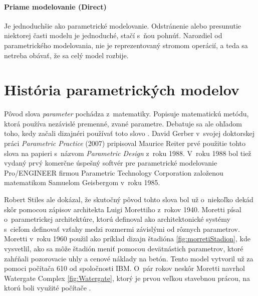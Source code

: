 \paragraph{Priame modelovanie (Direct)}
Je jednoduchšie ako parametrické modelovanie. Odstránenie alebo presunutie niektorej časti modelu je jednoduché, stačí s~ňou pohnúť. Narozdiel od parametrického modelovania, nie je reprezentovaný stromom operácií, a teda sa netreba obávať, že sa celý model rozbije. 


\section{História parametrických modelov}



Pôvod slova \textit{parameter} pochádza z~matematiky. Popisuje matematickú metódu, ktorá používa nezávislé premenné, zvané parametre. Debatuje sa ale ohľadom toho, kedy začali dizajnéri používať toto slovo \cite{davis_2013}. David Gerber v~svojej doktorskej práci \textit{Parametric Practice} (2007) pripisoval Maurice Reiter prvé použitie tohto slova na papieri s~názvom \textit{Parametric Design} z~roku 1988. V~roku 1988 bol tiež vydaný prvý komerčne úspešný softvér pre parametrické modelovanie \textsf{Pro/ENGINEER} firmou Parametric Technology Corporation založenou matematikom Samuelom Geisbergom v~roku 1985.

Robert Stiles ale dokázal, že skutočný pôvod tohto slova bol už o~niekoľko dekád skôr pomocou zápisov architekta Luigi Morettiho z~rokov 1940.  Moretti písal o~parametrickej architektúre, ktorú definoval ako architektonické systémy s~cieľom 
definovať vzťahy medzi rozmermi závislými od rôznych parametrov.
Moretti v~roku 1960 použil ako príklad dizajn štadióna \ref{fig:morretiStadion}, kde vysvetlil, ako sa môže štadión meniť pomocou devätnástich parametrov, ktoré zahŕňali pozorovacie uhly a cenové náklady na betón. Tento model vytvoril už za pomoci počítača 610 od spoločnosti IBM\cite{doi:10.1002/ad.2019}. O~pár rokov neskôr Moretti navrhol Watergate Complex \ref{fig:Watergate}, ktorý je prvou veľkou stavebnou prácou, na ktorú boli využité počítače \cite{davis_2013}. 


